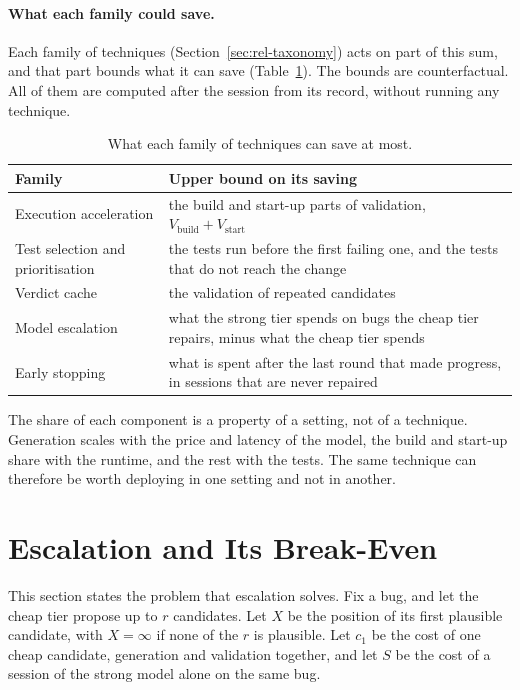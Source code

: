 \paragraph{What each family could save.} Each family of techniques
(Section~\ref{sec:rel-taxonomy}) acts on part of this sum, and that part
bounds what it can save (Table~\ref{tab:bg-headroom}). The bounds are
counterfactual. All of them are computed after the session from its record,
without running any technique.

\begin{table}[htbp]
\centering
\caption{What each family of techniques can save at most.}
\label{tab:bg-headroom}
\footnotesize
\begin{tabularx}{\textwidth}{@{}>{\raggedright\arraybackslash}p{} >{\raggedright\arraybackslash}X@{}}
\toprule
Family & Upper bound on its saving\\
\midrule
Execution acceleration & the build and start-up parts of validation, $V_{\mathrm{build}} + V_{\mathrm{start}}$\\
Test selection and prioritisation & the tests run before the first failing one, and the tests that do not reach the change\\
Verdict cache & the validation of repeated candidates\\
Model escalation & what the strong tier spends on bugs the cheap tier repairs, minus what the cheap tier spends\\
Early stopping & what is spent after the last round that made progress, in sessions that are never repaired\\
\bottomrule
\end{tabularx}
\end{table}

The share of each component is a property of a setting, not of a technique.
Generation scales with the price and latency of the model, the build and
start-up share with the runtime, and the rest with the tests. The same
technique can therefore be worth deploying in one setting and not in another.

\section{Escalation and Its Break-Even}
\label{sec:bg-escalation}

This section states the problem that escalation solves. Fix a bug, and let the
cheap tier propose up to $r$ candidates. Let $X$ be the position of its first
plausible candidate, with $X = \infty$ if none of the $r$ is plausible. Let
$c_1$ be the cost of one cheap candidate, generation and validation together,
and let $S$ be the cost of a session of the strong model alone on the same bug.

